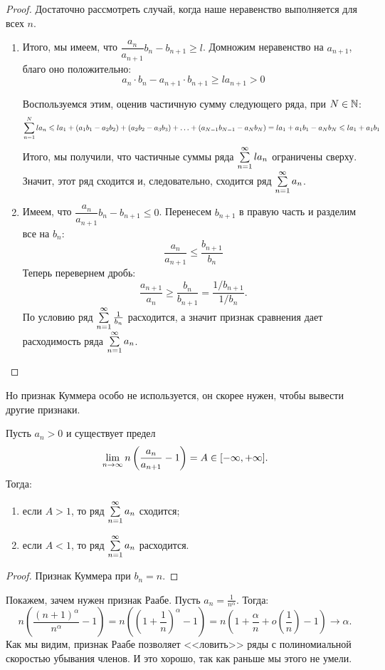 \begin{proof}
Достаточно рассмотреть случай, когда наше неравенство выполняется для всех $n$.
\begin{enumerate}
\item Итого, мы имеем, что $\dfrac{a_n}{a_{n+1}}b_n - b_{n+1} \geq l$. Домножим неравенство на $a_{n+1}$, благо оно положительно:
$$
a_n\cdot b_n - a_{n+1}\cdot b_{n+1} \geq la_{n+1} > 0
$$

Воспользуемся этим, оценив частичную сумму следующего ряда, при $N \in \mathbb{N}$:
$$
\sum\limits_{n=1}^{N} la_n \leqslant la_1 + (a_1b_1 - a_2b_2) + (a_2b_2 - a_3b_3) + \ldots + (a_{N-1}b_{N-1} - a_Nb_N)
= la_1 + a_1b_1 - a_Nb_N \leqslant la_1 + a_1b_1
$$
Итого, мы получили, что частичные суммы ряда $\sum\limits_{n=1}^{\infty} la_n$ ограничены сверху. Значит, этот ряд сходится и, следовательно, сходится ряд $\sum\limits_{n=1}^{\infty}a_n$.

\item Имеем, что $\dfrac{a_n}{a_{n+1}}b_n - b_{n+1} \leq 0$. Перенесем $b_{n+1}$ в правую часть и разделим все на $b_n$:
$$
\frac{a_n}{a_{n+1}} \leq \frac{b_{n+1}}{b_n}
$$
Теперь перевернем дробь:
$$
\frac{a_{n+1}}{a_n} \geq \frac{b_n}{b_{n+1}} = \frac{1/ b_{n+1}}{1 / b_{n}}.
$$
По условию ряд $\sum\limits_{n=1}^{\infty}\frac{1}{b_n}$ расходится, а значит признак сравнения дает расходимость ряда $\sum\limits_{n=1}^{\infty}a_n$.
\end{enumerate}
\end{proof}

Но признак Куммера особо не используется, он скорее нужен, чтобы вывести другие признаки.
\begin{Test}
Пусть $a_n > 0$ и существует предел 
$$
\lim\limits_{n \rightarrow \infty} n \left( \dfrac{a_n}{a_{n+1}} - 1 \right) = A \in [-\infty, +\infty].
$$
Тогда:
\begin{enumerate}
\item если $A > 1$, то ряд $\sum\limits_{n=1}^{\infty}a_n$ сходится;
\item если $A < 1$, то ряд $\sum\limits_{n=1}^{\infty}a_n$ расходится.
\end{enumerate}
\end{Test}

\begin{proof}
Признак Куммера при $b_n = n$.
\end{proof}

Покажем, зачем нужен признак Раабе. Пусть $a_n = \frac{1}{n^\alpha}$. Тогда:
$$
n\left( \frac{(n+1)^\alpha}{n^{\alpha}} - 1 \right) = n\left( \left( 1 + \frac{1}{n} \right)^\alpha  - 1\right) = n\left( 1 + \frac{\alpha}{n} + o\left(\frac{1}{n}\right) - 1\right) \longrightarrow \alpha.
$$
Как мы видим, признак Раабе позволяет <<ловить>> ряды с полиномиальной скоростью убывания членов. И это хорошо, так как раньше мы этого не умели.

